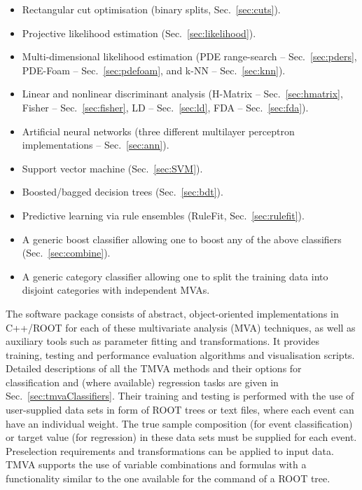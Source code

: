 \begin{itemize}

\item Rectangular cut optimisation (binary splits, Sec.~\ref{sec:cuts}).

\item Projective likelihood estimation (Sec.~\ref{sec:likelihood}).

\item Multi-dimensional likelihood estimation (PDE range-search -- Sec.~\ref{sec:pders}, 
      PDE-Foam -- Sec.~\ref{sec:pdefoam}, and k-NN -- Sec.~\ref{sec:knn}).

\item Linear and nonlinear discriminant analysis 
      (H-Matrix -- Sec.~\ref{sec:hmatrix}, Fisher -- Sec.~\ref{sec:fisher}, 
      LD -- Sec.~\ref{sec:ld}, FDA -- Sec.~\ref{sec:fda}).

\item Artificial neural networks (three different
      multilayer perceptron implementations -- Sec.~\ref{sec:ann}).

\item Support vector machine (Sec.~\ref{sec:SVM}).

\item Boosted/bagged decision trees (Sec.~\ref{sec:bdt}).

\item Predictive learning via rule ensembles (RuleFit, Sec.~\ref{sec:rulefit}).

\item A generic boost classifier allowing one to boost any of the above 
      classifiers (Sec.~\ref{sec:combine}).

\item A generic category classifier allowing one to split the training data into 
      disjoint categories with independent MVAs.

\end{itemize}

The software package consists of abstract, object-oriented implementations in C++/ROOT for 
each of these multivariate analysis (MVA) techniques, as well as auxiliary tools such as 
parameter fitting and transformations. It provides training, testing and performance evaluation 
algorithms and visualisation scripts. Detailed descriptions of all the TMVA methods and 
their options for classification and (where available) regression tasks are given in 
Sec.~\ref{sec:tmvaClassifiers}. Their training and testing is 
performed with the use of user-supplied data sets in form of ROOT trees or text files, where
each event can have an individual weight. The true sample composition (for event classification) 
or target value (for regression) in these data sets must be supplied for each event. 
Preselection requirements and transformations 
can be applied to input data. TMVA supports the use of variable combinations and 
formulas with a functionality similar to the one available for the  command of a ROOT tree.

